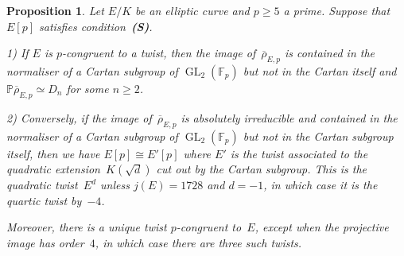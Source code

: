 \documentclass[12pt, reqno]{amsart}
\newcommand{\F}{\mathbb{F}}
\newcommand{\PP}{\mathbb{P}}
\newcommand{\rhobar}{{\overline{\rho}}}
\newcommand{\GL}{\operatorname{GL}}
\numberwithin{equation}{section}
\newtheorem{proposition}[theorem]{Proposition}
\theoremstyle{definition}
\theoremstyle{remark}
\newcommand{\condS}{condition~{\bf (S)}}
\begin{document}
\begin{comment}
When the projective image is~$D_n$ with $n\ge2$, it is often the case
that the image is contained in the normaliser~$N$ of a Cartan
subgroup~$C$ of~$\GL_2(\F_p)$.  For $n=2$, the projective image
is~$D_2\cong C_2\times C_2$, and there are there are three different
choices for~$C$ for which this holds, while for $n\ge3$ the Cartan
subgroup is unique.  The image may be dihedral in other ways, for
example $\left\{\begin{pmatrix}\pm1&*\\0&1\end{pmatrix}\right\}$, but
this is reducible so by the previous lemma does not give rise to a
congruent quadratic twist.
\end{comment}

\begin{proposition}\label{P:twist}
Let $E/K$ be an elliptic curve and $p \geq 5$ a prime. Suppose
that~$E[p]$ satisfies \condS.

1) If $E$ is $p$-congruent to a twist, 
then the image of~$\rhobar_{E,p}$ is contained in the normaliser of a
Cartan subgroup of $\GL_2(\F_p)$ but not in the Cartan itself and
$\PP \rhobar_{E,p} \simeq D_n$ for some $n \geq 2$.

2) Conversely, if the image of~$\rhobar_{E,p}$ is absolutely irreducible and contained in the
normaliser of a Cartan subgroup of $\GL_2(\F_p)$ but not in the Cartan
subgroup itself, 
then we have $E[p]\cong E'[p]$ where $E'$ is the twist associated to
the quadratic extension~$K(\sqrt{d})$ cut out by the Cartan subgroup.
This is the quadratic twist~$E^d$ unless $j(E)=1728$ and $d=-1$, in
which case it is the quartic twist by~$-4$.

Moreover, there is a unique twist $p$-congruent to~$E$, except when the
projective image has order~$4$, in which case there are three such
twists.
\end{proposition}
\end{document}
